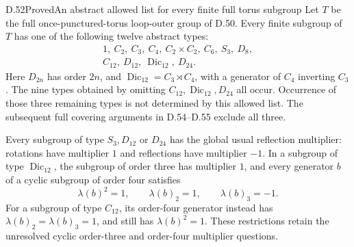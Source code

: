 \begin{claim}{D.52}{Proved}{An abstract allowed list for every finite full torus subgroup}
Let $T$ be the full once-punctured-torus loop-outer
group of D.50. Every finite subgroup of $T$ has
one of the following twelve abstract types:
\[
\begin{gathered}
1,\ C_2,\ C_3,\ C_4,\ C_2\times C_2,\ C_6,\ S_3,\ D_8,\\
C_{12},\ D_{12},\ \operatorname{Dic}_{12},\ D_{24}.
\end{gathered}                                             \tag{D.52a}
\]
Here $D_{2n}$ has order $2n$, and
$\operatorname{Dic}_{12}=C_3\rtimes C_4$, with
a generator of $C_4$ inverting $C_3$.
The nine types obtained by omitting
$C_{12},\operatorname{Dic}_{12},D_{24}$ all occur.
Occurrence of those three remaining types is
not determined by this allowed list.
The subsequent full covering arguments in D.54--D.55
exclude all three.

Every subgroup of type $S_3,D_{12}$ or $D_{24}$
has the global usual reflection multiplier:
rotations have multiplier $1$ and reflections
have multiplier $-1$.
In a subgroup of type $\operatorname{Dic}_{12}$,
the subgroup of order three has multiplier $1$,
and every generator $b$ of a cyclic subgroup
of order four satisfies
\[
       \lambda(b)^2=1,\qquad
       \lambda(b)_2=1,\qquad\lambda(b)_3=-1.              \tag{D.52b}
\]
For a subgroup of type $C_{12}$, its order-four
generator instead has $\lambda(b)_2=\lambda(b)_3=1$,
and still has $\lambda(b)^2=1$.
These restrictions retain the unresolved cyclic
order-three and order-four multiplier questions.
\end{claim}

